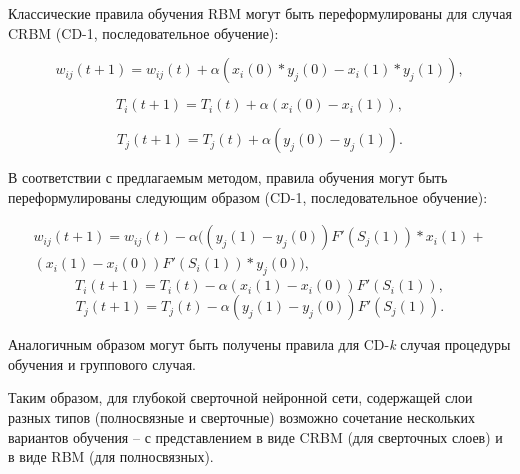 Классические правила обучения RBM могут быть переформулированы для случая CRBM (CD-1, последовательное обучение): 

\begin{equation*}
		w_{ij}(t+1)=w_{ij}(t)+\alpha(x_i(0) * y_j(0)-x_i(1) * y_j(1)),
\end{equation*} 

\begin{equation*}	
		T_i(t+1)=T_i(t)+\alpha(x_i(0)-x_i(1)),
\end{equation*} 

\begin{equation*}		
		T_j(t+1)=T_j(t)+\alpha(y_j(0)-y_j(1)).
\end{equation*}

В соответствии с предлагаемым методом, правила обучения могут быть переформулированы следующим образом (CD-1, последовательное обучение):

\begin{multline*}
    w_{ij}(t+1)=w_{ij}(t)-\alpha((y_j(1)-y_j(0))F'(S_j(1)) * x_i(1)+\\(x_i(1)-x_i(0))F'(S_i(1)) * y_j(0)),    
\end{multline*}
\begin{equation*}
    T_i(t+1)=T_i(t)-\alpha(x_i(1)-x_i(0))F'(S_i(1)),
\end{equation*}
\begin{equation*}
    T_j(t+1)=T_j(t)-\alpha(y_j(1)-y_j(0))F'(S_j(1)).  
\end{equation*}

Аналогичным образом могут быть получены правила для CD-\textit{k} случая процедуры обучения и группового случая.

Таким образом, для глубокой сверточной нейронной сети, содержащей слои разных типов (полносвязные и сверточные) возможно сочетание нескольких вариантов обучения -- с представлением в виде CRBM (для сверточных слоев) и в виде RBM (для полносвязных).  

